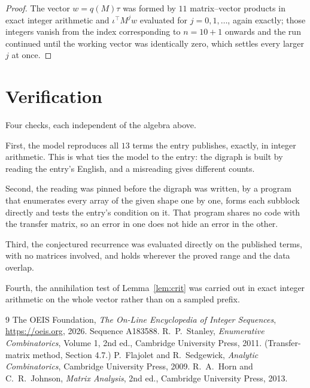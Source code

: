 \documentclass[11pt,a4paper]{article}
\theoremstyle{plain}
\theoremstyle{definition}
\begin{document}
\begin{proof}
The vector $w=q(M)\tau$ was formed by $11$ matrix--vector products in exact integer
arithmetic and $\iota^{\!\top}M^{j}w$ evaluated for $j=0,1,\dots$, again exactly; those
integers vanish from the index corresponding to $n=10+1$ onwards and the run continued
until the working vector was identically zero, which settles every larger $j$ at once.
\end{proof}

\section{Verification}

Four checks, each independent of the algebra above.

First, the model reproduces all $13$ terms the entry publishes, exactly, in integer
arithmetic. This is what ties the model to the entry: the digraph is built by reading the
entry's English, and a misreading gives different counts.

Second, the reading was pinned before the digraph was written, by a program that enumerates
every array of the given shape one by one, forms each subblock directly and tests the entry's
condition on it. That program shares no code with the transfer matrix, so an error in one does
not hide an error in the other.

Third, the conjectured recurrence was evaluated directly on the published terms, with no
matrices involved, and holds wherever the proved range and the data overlap.

Fourth, the annihilation test of Lemma~\ref{lem:crit} was carried out in exact integer
arithmetic on the whole vector rather than on a sampled prefix.

\begin{thebibliography}{9}
 The OEIS Foundation, \emph{The On-Line Encyclopedia of Integer
Sequences}, \url{https://oeis.org}, 2026. Sequence A183588.
 R.~P.~Stanley, \emph{Enumerative Combinatorics}, Volume 1, 2nd ed.,
Cambridge University Press, 2011. (Transfer-matrix method, Section 4.7.)
 P.~Flajolet and R.~Sedgewick, \emph{Analytic Combinatorics}, Cambridge
University Press, 2009.
 R.~A.~Horn and C.~R.~Johnson, \emph{Matrix Analysis}, 2nd ed., Cambridge
University Press, 2013.
\end{thebibliography}
\end{document}
